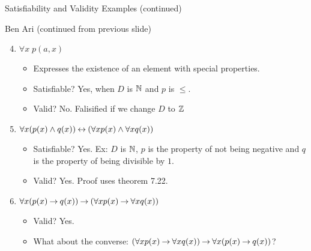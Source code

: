 \begin{wideslide}[bm=,toc=]{Satisfiability and Validity Examples (continued)}
\begin{defn}{7.25}{Ben Ari}
(continued from previous slide)
\end{defn}
\begin{enumerate}
\setcounter{enumi}{3}
\item<2-> $\forall x \; p(a,x)$
\begin{itemize}
\item<3-> Expresses the existence of an element with special properties.
\item<3-> Satisfiable? \pause[3] Yes, when $D$ is $\mathbb{N}$ and $p$ is $\leq$.
\item<3-> Valid? \pause No. Falisified if we change $D$ to $\mathbb{Z}$ 
\end{itemize}
\item<6-> $\forall x (p(x) \land q(x)) \mathbin{\leftrightarrow} (\forall x p(x) \land \forall x
    q(x))$
\begin{itemize}
\item<7-> Satisfiable? \pause[3] Yes. Ex: $D$ is $\mathbb{N}$, $p$ is the property of
not being negative and $q$ is the property of being divisible by $1$. 
\item<7-> Valid? \pause Yes. Proof uses theorem 7.22. 
\end{itemize}
\item<10-> $\forall x (p(x) \mathbin{\rightarrow} q(x)) \mathbin{\rightarrow} (\forall x p(x) \mathbin{\rightarrow} \forall x q(x))$
\begin{itemize}
\item<11-> Valid? \pause Yes. 
\item<11-> What about the converse: $(\forall x p(x) \mathbin{\rightarrow} \forall x q(x)) \mathbin{\rightarrow} \forall x (p(x) \mathbin{\rightarrow} q(x))$?
\end{itemize}
\end{enumerate}
\end{wideslide}

